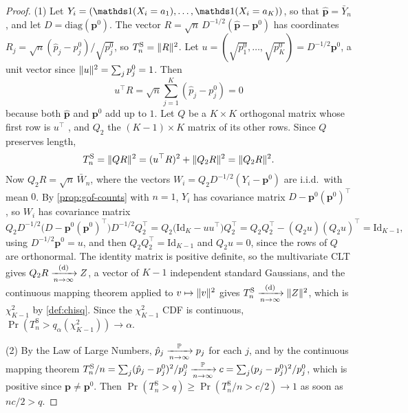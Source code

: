 \begin{proof}
(1) Let $Y_i = (\ind(X_i = a_1), \ldots, \ind(X_i = a_K))$, so that $\hat{\mathbf{p}} = \bar{Y}_n$, and let $D = \mathrm{diag}(\mathbf{p}^0)$.
The vector $R = \sqrt{n}\,D^{-1/2}(\hat{\mathbf{p}} - \mathbf{p}^0)$ has coordinates $R_j = \sqrt{n}(\hat{p}_j - p^0_j)/\sqrt{p^0_j}$, so $T^{\mathrm{S}}_n = \lVert R\rVert^2$.
Let $u = (\sqrt{p^0_1}, \ldots, \sqrt{p^0_K}) = D^{-1/2}\mathbf{p}^0$, a unit vector since $\lVert u\rVert^2 = \sum_j p^0_j = 1$.
Then
\[
u^\top R = \sqrt{n}\sum_{j=1}^K(\hat{p}_j - p^0_j) = 0
\]
because both $\hat{\mathbf{p}}$ and $\mathbf{p}^0$ add up to $1$.
Let $Q$ be a $K \times K$ orthogonal matrix whose first row is $u^\top$ , and $Q_2$ the $(K-1) \times K$ matrix of its other rows.
Since $Q$ preserves length,
\[
T^{\mathrm{S}}_n = \lVert QR\rVert^2 = (u^\top R)^2 + \lVert Q_2R\rVert^2 = \lVert Q_2R\rVert^2.
\]
Now $Q_2R = \sqrt{n}\,\bar{W}_n$, where the vectors $W_i = Q_2D^{-1/2}(Y_i - \mathbf{p}^0)$ are i.i.d.\ with mean $0$.
By \cref{prop:gof-counts} with $n = 1$, $Y_i$ has covariance matrix $D - \mathbf{p}^0(\mathbf{p}^0)^\top$, so $W_i$ has covariance matrix
\[
Q_2D^{-1/2}\big(D - \mathbf{p}^0(\mathbf{p}^0)^\top\big)D^{-1/2}Q_2^\top = Q_2\big(\mathrm{Id}_K - uu^\top\big)Q_2^\top = Q_2Q_2^\top - (Q_2u)(Q_2u)^\top = \mathrm{Id}_{K-1},
\]
using $D^{-1/2}\mathbf{p}^0 = u$, and then $Q_2Q_2^\top = \mathrm{Id}_{K-1}$ and $Q_2u = 0$, since the rows of $Q$ are orthonormal.
The identity matrix is positive definite, so the multivariate CLT gives $Q_2R \xrightarrow [n \to \infty ]{\text{(d)}} Z$, a vector of $K - 1$ independent standard Gaussians, and the continuous mapping theorem applied to $v \mapsto \lVert v\rVert^2$ gives $T^{\mathrm{S}}_n \xrightarrow [n \to \infty ]{\text{(d)}} \lVert Z\rVert^2$, which is $\chi^2_{K-1}$ by \cref{def:chisq}.
Since the $\chi^2_{K-1}$ CDF is continuous, $\Pr(T^{\mathrm{S}}_n > q_\alpha(\chi^2_{K-1})) \to \alpha$.

(2) By the Law of Large Numbers, $\hat{p}_j \xrightarrow [n \to \infty ]{\mathbb{P}} p_j$ for each $j$, and by the continuous mapping theorem $T^{\mathrm{S}}_n/n = \sum_j(\hat{p}_j - p^0_j)^2/p^0_j \xrightarrow [n \to \infty ]{\mathbb{P}} c = \sum_j(p_j - p^0_j)^2/p^0_j$, which is positive since $\mathbf{p} \neq \mathbf{p}^0$.
Then $\Pr(T^{\mathrm{S}}_n > q) \geq \Pr(T^{\mathrm{S}}_n/n > c/2) \to 1$ as soon as $nc/2 > q$.
\end{proof}

